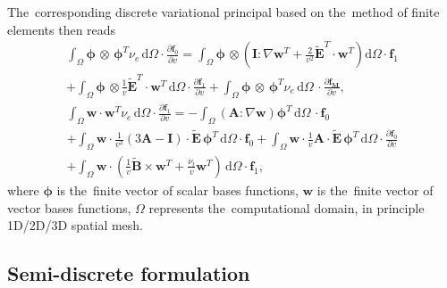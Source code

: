 \documentclass[review]{elsarticle}
\newcommand{\pdv}[2]{\frac{\partial{#1}}{\partial{#2}}}
\newcommand{\vect}[1]{\boldsymbol{#1}}
\newcommand{\matr}[1]{\mathbf{#1}}
\newcommand{\dI}{\text{d}}
\newcommand{\nue}{\nu_{e}}
\newcommand{\nutot}{\nu_{t}}
\newcommand{\vmag}{v}
\newcommand{\B}{\vect{B}}
\newcommand{\tE}{\vect{\tilde{E}}}
\newcommand{\fM}{f_M}
\newcommand{\vfzero}{\vect{f}_0}
\newcommand{\fone}{\vect{f}_1}
\newcommand{\MI}{\matr{I}}
\newcommand{\MA}{\matr{A}}
\newcommand{\intO}{\int_{\Omega}}
\begin{document}
The~corresponding discrete variational principal based on the~method of 
finite elements then reads
\begin{multline}
  \intO\vect{\phi}\, \otimes\, \vect{\phi}^T 
  \nue\, \dI \Omega \cdot \pdv{\vfzero}{\vmag} = 
  \intO\vect{\phi}\, \otimes \left(\MI:\nabla\matr{w}^T + 
  \frac{2}{\vmag^2}\tE^T \cdot\matr{w}^T \right)\dI \Omega
  \cdot \fone \\
  + \intO\vect{\phi}\, \otimes
  \frac{1}{\vmag}\tE^T \cdot \matr{w}^T\, \dI \Omega 
  \cdot \pdv{\fone}{\vmag} + 
  \intO\vect{\phi}\, \otimes\, \vect{\phi}^T \nue\, \dI\Omega\,
  \cdot \pdv{\vect{\fM}}{\vmag} , 
  \label{eq:FEM1hosf0}
\end{multline}
\begin{multline}
  \intO\matr{w} \cdot \matr{w}^T \nue\, \dI\Omega \cdot 
  \pdv{\fone}{\vmag} =
  - \intO
  \left(\MA : \nabla\matr{w}\right)
  \vect{\phi}^T\, \dI \Omega\, 
  \cdot \vfzero \\
  + \intO\matr{w} \cdot 
  \frac{1}{\vmag^2} \left( 3\MA - \MI \right) \cdot \tE\,  
  \vect{\phi}^T\, \dI\Omega \cdot \vfzero 
  + \intO\matr{w} \cdot
  \frac{1}{\vmag} \MA \cdot \tE\, \vect{\phi}^T\, \dI \Omega 
  \cdot \pdv{\vfzero}{\vmag}\\
  + \intO\matr{w} \cdot
  \left(\frac{1}{\vmag}\tilde{\B}\times\matr{w}^T + 
  \frac{\nutot}{\vmag} \matr{w}^T\right)\, \dI\Omega 
  \cdot \fone ,
  \label{eq:FEM1hosf1}
\end{multline}
where $\vect{\phi}$ is the~finite vector of scalar bases functions, 
$\matr{w}$ is the~finite vector of vector bases functions,
$\Omega$ represents the~computational domain, in principle 1D/2D/3D 
spatial mesh. 

\subsection{Semi-discrete formulation}\label{sec:semidiscrete_form}
\end{document}

